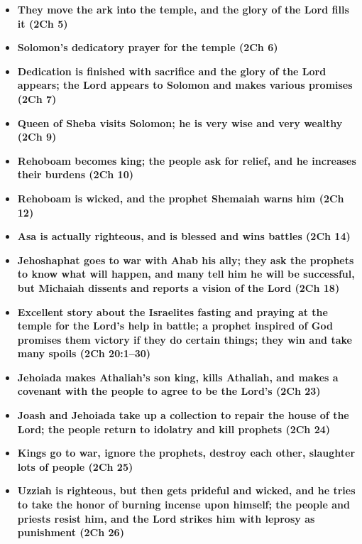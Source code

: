 \begin{itemize}
\item \textbf{They move the ark into the temple, and the glory of the Lord fills it (2Ch 5)}

\item \textbf{Solomon's dedicatory prayer for the temple (2Ch 6)}

\item \textbf{Dedication is finished with sacrifice and the glory of the Lord appears; the Lord appears to Solomon and makes various promises (2Ch 7)} 

\item \textbf{Queen of Sheba visits Solomon; he is very wise and very wealthy (2Ch 9)}

\item \textbf{Rehoboam becomes king; the people ask for relief, and he increases their burdens (2Ch 10)}

\item \textbf{Rehoboam is wicked, and the prophet Shemaiah warns him (2Ch 12)}

\item \textbf{Asa is actually righteous, and is blessed and wins battles (2Ch 14)}

\item \textbf{Jehoshaphat goes to war with Ahab his ally; they ask the prophets to know what will happen, and many tell him he will be successful, but Michaiah dissents and reports a vision of the Lord (2Ch 18)}

\item \textbf{Excellent story about the Israelites fasting and praying at the temple for the Lord's help in battle; a prophet inspired of God promises them victory if they do certain things; they win and take many spoils (2Ch 20:1--30)}

\item \textbf{Jehoiada makes Athaliah's son king, kills Athaliah, and makes a covenant with the people to agree to be the Lord's (2Ch 23)}

\item \textbf{Joash and Jehoiada take up a collection to repair the house of the Lord; the people return to idolatry and kill prophets (2Ch 24)}

\item \textbf{Kings go to war, ignore the prophets, destroy each other, slaughter lots of people (2Ch 25)}

\item \textbf{Uzziah is righteous, but then gets prideful and wicked, and he tries to take the honor of burning incense upon himself; the people and priests resist him, and the Lord strikes him with leprosy as punishment (2Ch 26)} 


\end{itemize}
